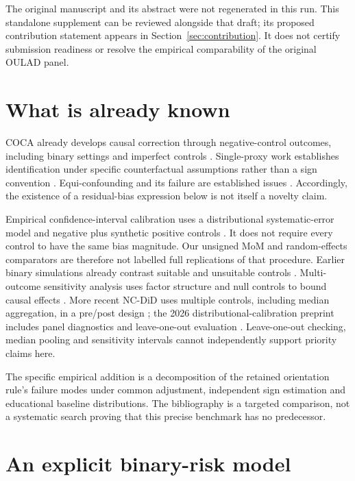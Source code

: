\documentclass[11pt,a4paper]{article}
\begin{document}
The original manuscript and its abstract were not regenerated in this run. This standalone supplement can be reviewed alongside that draft; its proposed contribution statement appears in Section~\ref{sec:contribution}. It does not certify submission readiness or resolve the empirical comparability of the original OULAD panel.

\section{What is already known}

COCA already develops causal correction through negative-control outcomes, including binary settings and imperfect controls \cite{coca}. Single-proxy work establishes identification under specific counterfactual assumptions rather than a sign convention \cite{park}. Equi-confounding and its failure are established issues \cite{caveats}. Accordingly, the existence of a residual-bias expression below is not itself a novelty claim.

Empirical confidence-interval calibration uses a distributional systematic-error model and negative plus synthetic positive controls \cite{schuemie}. It does not require every control to have the same bias magnitude. Our unsigned MoM and random-effects comparators are therefore not labelled full replications of that procedure. Earlier binary simulations already contrast suitable and unsuitable controls \cite{hwang}. Multi-outcome sensitivity analysis uses factor structure and null controls to bound causal effects \cite{zheng}. More recent NC-DiD uses multiple controls, including median aggregation, in a pre/post design \cite{ncdid}; the 2026 distributional-calibration preprint includes panel diagnostics and leave-one-out evaluation \cite{dc}. Leave-one-out checking, median pooling and sensitivity intervals cannot independently support priority claims here.

The specific empirical addition is a decomposition of the retained orientation rule's failure modes under common adjustment, independent sign estimation and educational baseline distributions. The bibliography is a targeted comparison, not a systematic search proving that this precise benchmark has no predecessor.

\section{An explicit binary-risk model}
\end{document}
